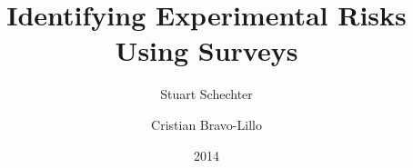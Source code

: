\documentclass{article}
\begin{document}


\title{Identifying Experimental Risks Using Surveys}


\author{
  Stuart Schechter \and 
 Cristian Bravo-Lillo
}

\date{2014}







\maketitle





%
%
%



\clearpage\appendix
%

%
\end{document}
